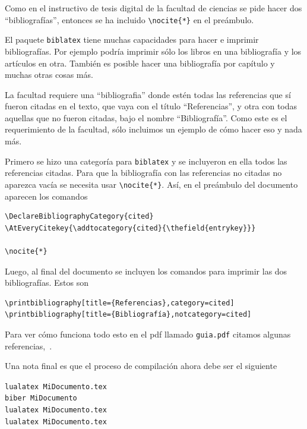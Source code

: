 Como en el instructivo de tesis digital de la facultad de ciencias se pide 
hacer dos \enquote{bibliografías}, entonces se ha incluido \verb|\nocite{*}| en 
el preámbulo.

El paquete \texttt{biblatex} tiene muchas capacidades para hacer e imprimir 
bibliografías. Por ejemplo podría imprimir sólo los libros en una bibliografía 
y los artículos en otra. También es posible hacer una bibliografía por capítulo 
y muchas otras cosas más.

La facultad requiere una \enquote{bibliografia} donde estén todas las 
referencias que sí fueron citadas en el texto, que vaya con el título 
\enquote{Referencias}, y otra con todas aquellas que no fueron citadas, bajo el 
nombre \enquote{Bibliografía}. Como este es el requerimiento de la facultad, 
sólo incluimos un ejemplo de cómo hacer eso y nada más.

Primero se hizo una categoría para \texttt{biblatex} y se incluyeron en ella todos las referencias citadas. Para que la bibliografía con las referencias no citadas no aparezca vacía se necesita usar \verb|\nocite{*}|. Así, en el preámbulo del documento aparecen los comandos
\begin{verbatim}
\DeclareBibliographyCategory{cited}
\AtEveryCitekey{\addtocategory{cited}{\thefield{entrykey}}}

\nocite{*}
\end{verbatim}
Luego, al final del documento se incluyen los comandos para imprimir las dos bibliografías. Estos son
\begin{verbatim}
\printbibliography[title={Referencias},category=cited]
\printbibliography[title={Bibliografía},notcategory=cited]
\end{verbatim}

Para ver cómo funciona todo esto en el pdf llamado \texttt{guia.pdf} citamos algunas referencias,~\cite{ACohesion,Homotopy,ToposT,CWM}.

Una nota final es que el proceso de compilación ahora debe ser el siguiente
\begin{flushleft}
\verb|lualatex MiDocumento.tex|\\
\verb|biber MiDocumento|\\
\verb|lualatex MiDocumento.tex|\\
\verb|lualatex MiDocumento.tex|
\end{flushleft}
